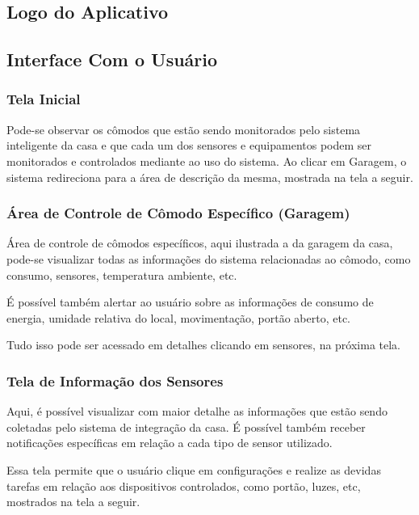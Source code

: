 \subsection{Logo do Aplicativo}


\subsection{Interface Com o Usuário}

\subsubsection{Tela Inicial}


\par Pode-se observar os cômodos que estão sendo monitorados pelo sistema inteligente da casa e que cada um dos sensores e equipamentos podem ser monitorados e controlados mediante ao uso do sistema. Ao clicar em Garagem, o sistema redireciona para a área de descrição da mesma, mostrada na tela a seguir.

\subsubsection{Área de Controle de Cômodo Específico (Garagem)}


\par Área de controle de cômodos específicos, aqui ilustrada a da garagem da casa, pode-se visualizar todas as informações do sistema relacionadas ao cômodo, como consumo, sensores, temperatura ambiente, etc.
\par É possível também alertar ao usuário sobre as informações de consumo de energia, umidade relativa do local, movimentação, portão aberto, etc.
\par Tudo isso pode ser acessado em detalhes clicando em sensores, na próxima tela.

\subsubsection{Tela de Informação dos Sensores}


\par Aqui, é possível visualizar com maior detalhe as informações que estão sendo coletadas pelo sistema de integração da casa. É possível também receber notificações específicas em relação a cada tipo de sensor utilizado.
\par Essa tela permite que o usuário clique em configurações e realize as devidas tarefas em relação aos dispositivos controlados, como portão, luzes, etc, mostrados na tela a seguir.

